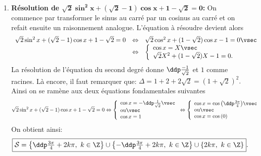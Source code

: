 \begin{correction}
\begin{enumerate}
\begin{minipage}[c]{0.45\textwidth}
\begin{center}
\end{center}
\end{minipage}
\item  \textbf{R\'esolution de $\mathbf{ \sqrt{2}\sin^2{x}+(\sqrt{2}-1)\cos{x}+1-\sqrt{2}=0}$:}
On commence par transformer le sinus au carr\'e par un cosinus au carr\'e et on refait ensuite un raisonnement analogue.
L'\'equation \`a r\'esoudre devient alors
$$\begin{array}{lll}
\sqrt{2}\sin^2{x}+(\sqrt{2}-1)\cos{x}+1-\sqrt{2}=0&\Leftrightarrow  & \sqrt{2}\cos^2{x}+(1-\sqrt{2})\cos{x}-1=0\vsec\\
&\Leftrightarrow & 
\left\lbrace\begin{array}{l}
\cos{x}=X\vsec\\
\sqrt{2}X^2+(1-\sqrt{2})X-1=0.
\end{array}\right.\end{array}$$
La r\'esolution de l'\'equation du second degr\'e donne $\ddp\frac{-1}{\sqrt{2}}$ et $1$ comme racines. L\`a encore, il faut remarquer que: $\Delta=1+2+2\sqrt{2}=(1+\sqrt{2})^2.$
Ainsi on se ram\`ene aux deux \'equations fondamentales suivantes
$$
\sqrt{2}\sin^2{x}+(\sqrt{2}-1)\cos{x}+1-\sqrt{2}=0\Leftrightarrow  
\left\lbrace\begin{array}{l}
\cos{x}=-\ddp\frac{1}{\sqrt{2}}\vsec\\
\hbox{ou}\vsec\\
\cos{x}=1
\end{array}\right.
\Leftrightarrow 
\left\lbrace\begin{array}{l}
\cos{x}=\cos{\left( \ddp\frac{3\pi}{4} \right)}\vsec\\
\hbox{ou}\vsec\\
\cos{x}=\cos{(0)}
\end{array}\right.
$$
On obtient ainsi:
$$\fbox{$\mathcal{S}=\left\lbrace \ddp\frac{3\pi}{4}+2k\pi,\ k\in\Z\right\rbrace\cup\left\lbrace -\ddp\frac{3\pi}{4}+2k\pi,\ k\in\Z\right\rbrace\cup\left\lbrace 2k\pi,\ k\in\Z\right\rbrace$}.$$

\end{enumerate}
\end{correction}

